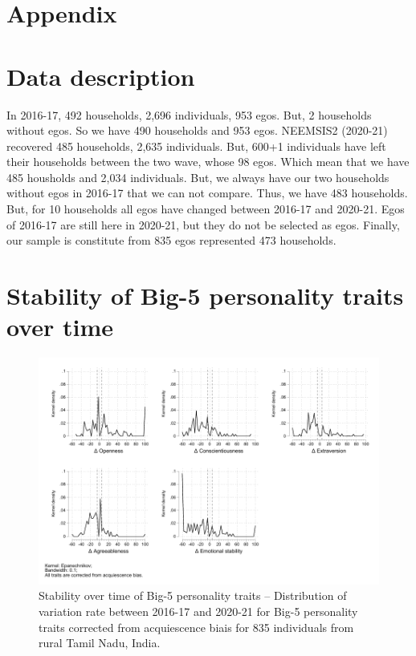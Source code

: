 \documentclass[a4paper, 11pt, onecolumn]{article}
\begin{document}

\section*{Appendix}
\label{app:APP}

\section{Data description}
\label{app:data}

In 2016-17, 492 households, 2,696 individuals, 953 egos.
But, 2 households without egos.
So we have 490 households and 953 egos.
NEEMSIS2 (2020-21) recovered 485 households, 2,635 individuals.
But, 600+1 individuals have left their households between the two wave, whose 98 egos.
Which mean that we have 485 housholds and 2,034 individuals.
But, we always have our two households without egos in 2016-17 that we can not compare.
Thus, we have 483 households.
But, for 10 households all egos have changed between 2016-17 and 2020-21.
Egos of 2016-17 are still here in 2020-21, but they do not be selected as egos. 
Finally, our sample is constitute from 835 egos represented 473 households.


\clearpage
\newpage
\section{Stability of Big-5 personality traits over time}
\label{section:stab_big5}

\begin{figure}[htpb]
\raggedright
\includegraphics[width=\textwidth]{INPUT/Stabcorr}
\caption{Stability over time of Big-5 personality traits -- Distribution of variation rate between 2016-17 and 2020-21 for Big-5 personality traits corrected from acquiescence biais for 835 individuals from rural Tamil Nadu, India.}
\label{fig:stab}
\end{figure}
\end{document}
